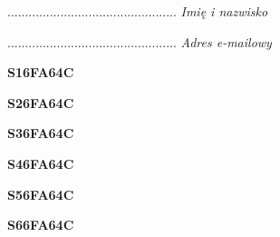 \begin{turn}{90}\begin{minipage}{\linewidth} \vspace{20mm} ................................................  \textit{Imię i nazwisko}\end{minipage}\end{turn}

\begin{turn}{90}\begin{minipage}{\linewidth} \vspace{20mm} ................................................  \textit{Adres e-mailowy}\end{minipage}\end{turn}

\begin{turn}{90}\huge \begin{minipage}{\linewidth} \vspace{10mm}\textbf{S16FA64C}\end{minipage}\end{turn}

\begin{turn}{90}\huge \begin{minipage}{\linewidth} \vspace{10mm}\textbf{S26FA64C}\end{minipage}\end{turn}

\begin{turn}{90}\huge \begin{minipage}{\linewidth} \vspace{10mm}\textbf{S36FA64C}\end{minipage}\end{turn}

\begin{turn}{90}\huge \begin{minipage}{\linewidth} \vspace{10mm}\textbf{S46FA64C}\end{minipage}\end{turn}

\begin{turn}{90}\huge \begin{minipage}{\linewidth} \vspace{10mm}\textbf{S56FA64C}\end{minipage}\end{turn}

\begin{turn}{90}\huge \begin{minipage}{\linewidth} \vspace{10mm}\textbf{S66FA64C}\end{minipage}\end{turn}

